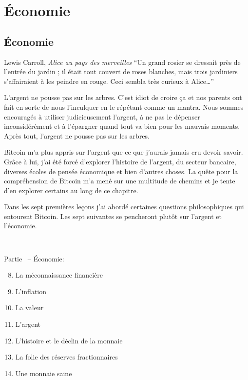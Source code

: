\part{Économie}
\label{ch:economics}
\chapter*{Économie}

\begin{chapquote}{Lewis Carroll, \textit{Alice au pays des merveilles}}
\enquote{Un grand rosier se dressait près de l’entrée du jardin ; il était tout
couvert de roses blanches, mais trois jardiniers s’affairaient à les peindre en
rouge. Ceci sembla très curieux à Alice\ldots}
\end{chapquote}

L'argent ne pousse pas sur les arbres. C'est idiot de croire ça et nos parents
ont fait en sorte de nous l'inculquer en le répétant comme un mantra. Nous
sommes encouragés à utiliser judicieusement l'argent, à ne pas le dépenser
inconsidérément et à l'épargner quand tout va bien pour les mauvais moments.
Après tout, l'argent ne pousse pas sur les arbres.

Bitcoin m'a plus appris sur l'argent que ce que j'aurais jamais cru devoir
savoir. Grâce à lui, j'ai été forcé d'explorer l'histoire de l'argent, du
secteur bancaire, diverses écoles de pensée économique et bien d'autres choses.
La quête pour la compréhension de Bitcoin m'a mené sur une multitude de chemins
et je tente d'en explorer certains au long de ce chapitre.

Dans les sept premières leçons j'ai abordé certaines questions philosophiques
qui entourent Bitcoin. Les sept suivantes se pencheront plutôt sur l'argent et
l'économie.

~

\begin{samepage}
Partie~\ref{ch:economics} -- Économie:

\begin{enumerate}
  \setcounter{enumi}{7}
  \item La méconnaissance financière
  \item L'inflation
  \item La valeur
  \item L'argent
  \item L'histoire et le déclin de la monnaie
  \item La folie des réserves fractionnaires
  \item Une monnaie saine
\end{enumerate}
\end{samepage}

